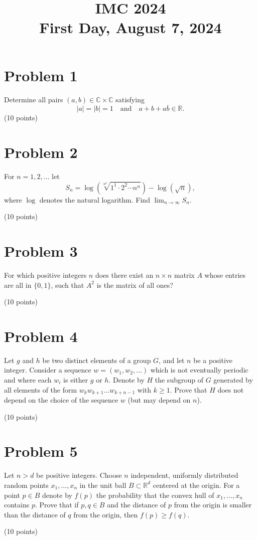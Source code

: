 \documentclass{article}
\title{IMC 2024 \\ First Day, August 7, 2024}
\date{}
\begin{document}
\maketitle

\section*{Problem 1}
Determine all pairs $(a,b) \in \mathbb{C} \times \mathbb{C}$ satisfying
\[
|a| = |b| = 1 \quad \text{and} \quad a + b + a\overline{b} \in \mathbb{R}.
\]
(10 points)

\section*{Problem 2}
For $n = 1, 2, \ldots$ let
\[
S_n = \log\left(\sqrt[n^2]{1^1 \cdot 2^2 \cdots n^n}\right) - \log(\sqrt{n}),
\]
where $\log$ denotes the natural logarithm. Find $\lim_{n \to \infty} S_n$.

(10 points)

\section*{Problem 3}
For which positive integers $n$ does there exist an $n \times n$ matrix $A$ whose entries are all in $\{0, 1\}$, such that $A^2$ is the matrix of all ones?

(10 points)

\section*{Problem 4}
Let $g$ and $h$ be two distinct elements of a group $G$, and let $n$ be a positive integer. Consider a sequence $w = (w_1, w_2, \ldots)$ which is not eventually periodic and where each $w_i$ is either $g$ or $h$. Denote by $H$ the subgroup of $G$ generated by all elements of the form $w_k w_{k+1} \ldots w_{k+n-1}$ with $k \geq 1$. Prove that $H$ does not depend on the choice of the sequence $w$ (but may depend on $n$).

(10 points)

\section*{Problem 5}
Let $n > d$ be positive integers. Choose $n$ independent, uniformly distributed random points $x_1, \ldots, x_n$ in the unit ball $B \subset \mathbb{R}^d$ centered at the origin. For a point $p \in B$ denote by $f(p)$ the probability that the convex hull of $x_1, \ldots, x_n$ contains $p$. Prove that if $p, q \in B$ and the distance of $p$ from the origin is smaller than the distance of $q$ from the origin, then $f(p) \geq f(q)$.

(10 points)
\end{document}
